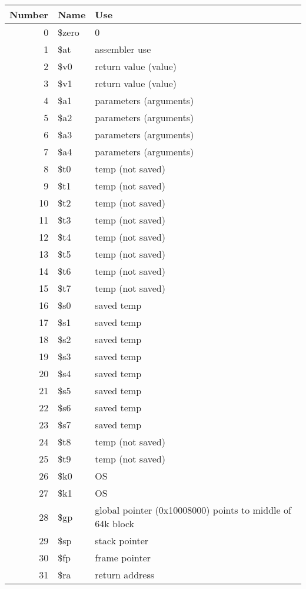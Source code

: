 \begin{tabular}{|r|l|p{4in}|}
  \hline
  Number & Name   & Use \\ \hline
  0      & \$zero & 0    \\ \hline
  1      & \$at   & assembler use             \\ \hline
  2      & \$v0   & return value (value)      \\ \hline
  3      & \$v1   & return value (value)      \\ \hline
  4      & \$a1   & parameters (arguments)    \\ \hline
  5      & \$a2   & parameters (arguments)    \\ \hline
  6      & \$a3   & parameters (arguments)    \\ \hline
  7      & \$a4   & parameters (arguments)    \\ \hline
  8      & \$t0   & temp (not saved)    \\ \hline
  9      & \$t1   & temp (not saved)    \\ \hline
  10     & \$t2   & temp (not saved)    \\ \hline
  11     & \$t3   & temp (not saved)    \\ \hline
  12     & \$t4   & temp (not saved)    \\ \hline
  13     & \$t5   & temp (not saved)    \\ \hline
  14     & \$t6   & temp (not saved)    \\ \hline
  15     & \$t7   & temp (not saved)    \\ \hline
  16     & \$s0   & saved temp    \\ \hline
  17     & \$s1   & saved temp    \\ \hline
  18     & \$s2   & saved temp    \\ \hline
  19     & \$s3   & saved temp    \\ \hline
  20     & \$s4   & saved temp    \\ \hline
  21     & \$s5   & saved temp    \\ \hline
  22     & \$s6   & saved temp    \\ \hline
  23     & \$s7   & saved temp    \\ \hline
  24     & \$t8   & temp (not saved)    \\ \hline
  25     & \$t9   & temp (not saved)    \\ \hline
  26     & \$k0   & OS    \\ \hline
  27     & \$k1   & OS    \\ \hline
  28     & \$gp   & global pointer (0x10008000) points to middle of 64k block    \\ \hline
  29     & \$sp   & stack pointer    \\ \hline
  30     & \$fp   & frame pointer    \\ \hline
  31     & \$ra   & return address    \\ \hline
\end{tabular}

